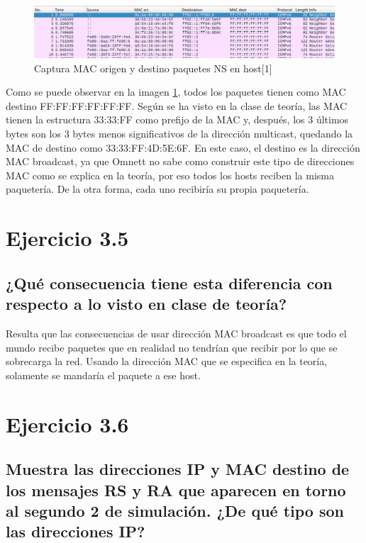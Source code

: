 \begin{figure}[H]
    \centering
    \includegraphics[width=135mm, scale=0.75]{imaxes/captura_ejer3_4.png}
    \caption{Captura MAC origen y destino paquetes NS en host[1]}
    \label{fig:ip_mac_host1}
\end{figure}

Como se puede observar en la imagen \ref{fig:ip_mac_host1}, todos los paquetes tienen como MAC destino FF:FF:FF:FF:FF:FF. Según se ha visto en la clase de teoría, las MAC tienen la estructura 33:33:FF como prefijo de la MAC y, después, los 3 últimos bytes son los 3 bytes menos significativos de la dirección multicast, quedando la MAC de destino como 33:33:FF:4D:5E:6F. En este caso, el destino es la dirección MAC broadcast, ya que Omnett no sabe como construir este tipo de direcciones MAC como se explica en la teoría, por eso todos los hosts reciben la misma paquetería. De la otra forma, cada uno recibiría su propia paquetería.

\section{Ejercicio 3.5}
\subsection{¿Qué consecuencia tiene esta diferencia con respecto a lo visto en clase de teoría?}

Resulta que las consecuencias de usar dirección MAC broadcast es que todo el mundo recibe paquetes que en realidad no tendrían que recibir por lo que se sobrecarga la red. Usando la dirección MAC que se especifica en la teoría, solamente se mandaría el paquete a ese host.

\section{Ejercicio 3.6} 
\subsection{Muestra las direcciones IP y MAC destino de los mensajes RS y RA que aparecen en torno al segundo 2 de
simulación. ¿De qué tipo son las direcciones IP?}

